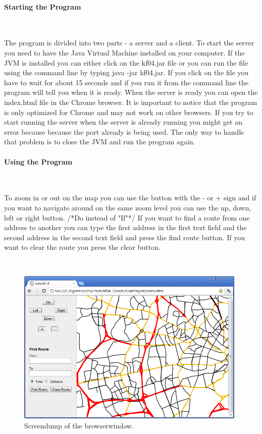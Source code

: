 \documentclass[a4paper,10pt,titlepage]{article}
\begin{document}
		\paragraph{Starting the Program}\mbox{}\

		The program is divided into two parts - a server and a client. To start the server you need to have the Java Virtual Machine installed on your computer. If the JVM is installed you can either click on the kf04.jar file or you can run the file using the command line by typing java -jar kf04.jar. If you click on the file you have to wait for about 15 seconds and if you run it from the command line the program will tell you when it is ready. When the server is ready you can open the index.html file in the Chrome browser. It is important to notice that the program is only optimized for Chrome and may not work on other browsers. If you try to start running the server when the server is already running you might get an error because because the port already is being used. The only way to handle that problem is to close the JVM and run the program again.  
		\paragraph{Using the Program}\mbox{}\
		
		To zoom in or out on the map you can use the button with the - or + sign and if you want to navigate around on the same zoom level you can use the up, down, left or right button. /*Do instead of "If"*/ If you want to find a route from one address to another you can type the first address in the first text field and the second address in the second text field and press the find route button. If you want to clear the route you press the clear button.

		 \mbox{}\\
		
		\begin{figure}[H]
\includegraphics[width=110mm]{screendump.png}
\caption{Screendump of the browserwindow.}
\label{fig:screendump}
\end{figure}
		
\end{document}
